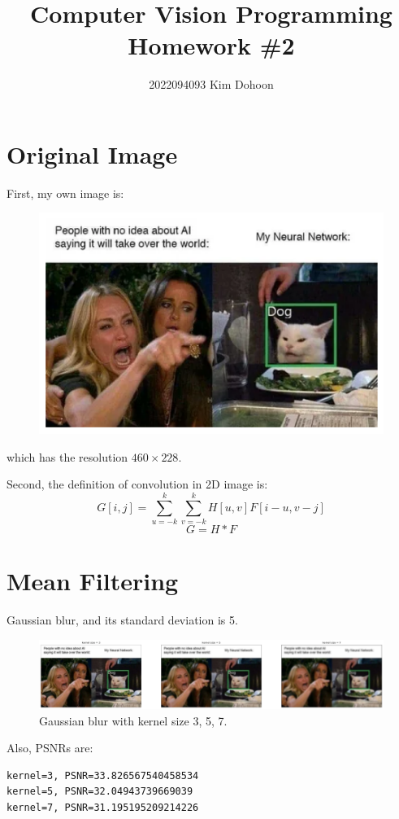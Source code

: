 \documentclass{article}
\title{Computer Vision Programming Homework \#2}
\author{2022094093 Kim Dohoon}
\affil{Department of Data Science, Major in Data Science}
\begin{document}
\maketitle

\section*{Original Image}
First, my own image is:  
\begin{figure}[!ht]
    \centering
    \includegraphics[width=.5\textwidth]{./fig/original.png}
\end{figure}  

which has the resolution $460\times 228$.

Second, the definition of convolution in 2D image is:
$$G[i, j] = \sum_{u=-k}^{k}\sum_{v=-k}^{k}H[u,v]F[i-u,v-j]$$
$$G = H * F$$

\newpage
\section{Mean Filtering}
Gaussian blur, and its standard deviation is 5.

\begin{figure}[!h]
    \centering
    \includegraphics[width=\textwidth]{fig/mean_filtering.png}
    \caption{Gaussian blur with kernel size 3, 5, 7.}
\end{figure}

Also, PSNRs are:
\begin{lstlisting}[backgroundcolor=\color{lightgray}]
kernel=3, PSNR=33.826567540458534
kernel=5, PSNR=32.04943739669039
kernel=7, PSNR=31.195195209214226
\end{lstlisting}
\end{document}
